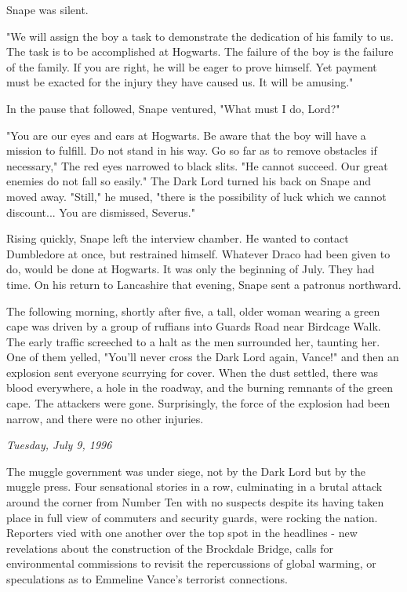 \documentclass[a4paper,11pt]{article}
\begin{document}
Snape was silent.

"We will assign the boy a task to demonstrate the dedication of his family to us. The task is to be accomplished at Hogwarts. The failure of the boy is the failure of the family. If you are right, he will be eager to prove himself. Yet payment must be exacted for the injury they have caused us. It will be amusing."

In the pause that followed, Snape ventured, "What must I do, Lord?"

"You are our eyes and ears at Hogwarts. Be aware that the boy will have a mission to fulfill. Do not stand in his way. Go so far as to remove obstacles if necessary," The red eyes narrowed to black slits. "He cannot succeed. Our great enemies do not fall so easily." The Dark Lord turned his back on Snape and moved away. "Still," he mused, "there is the possibility of luck which we cannot discount... You are dismissed, Severus."

Rising quickly, Snape left the interview chamber. He wanted to contact Dumbledore at once, but restrained himself. Whatever Draco had been given to do, would be done at Hogwarts. It was only the beginning of July. They had time. On his return to Lancashire that evening, Snape sent a patronus northward.

The following morning, shortly after five, a tall, older woman wearing a green cape was driven by a group of ruffians into Guards Road near Birdcage Walk. The early traffic screeched to a halt as the men surrounded her, taunting her. One of them yelled, "You'll never cross the Dark Lord again, Vance!" and then an explosion sent everyone scurrying for cover. When the dust settled, there was blood everywhere, a hole in the roadway, and the burning remnants of the green cape. The attackers were gone. Surprisingly, the force of the explosion had been narrow, and there were no other injuries.

\emph{Tuesday, July 9, 1996}

The muggle government was under siege, not by the Dark Lord but by the muggle press. Four sensational stories in a row, culminating in a brutal attack around the corner from Number Ten with no suspects despite its having taken place in full view of commuters and security guards, were rocking the nation. Reporters vied with one another over the top spot in the headlines - new revelations about the construction of the Brockdale Bridge, calls for environmental commissions to revisit the repercussions of global warming, or speculations as to Emmeline Vance's terrorist connections.
\end{document}
